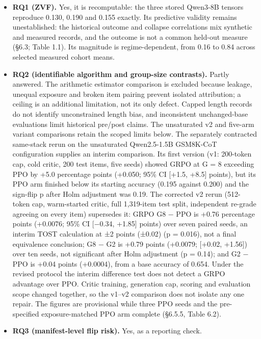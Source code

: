 \documentclass[12pt,a4paper]{report}
\providecommand{\tightlist}{%
  \setlength{\itemsep}{0pt}\setlength{\parskip}{0pt}}
\begin{document}
\begin{itemize}
\tightlist
\item
  \textbf{RQ1 (ZVF).} Yes, it is recomputable: the three stored Qwen3-8B
  tensors reproduce 0.130, 0.190 and 0.155 exactly. Its predictive
  validity remains unestablished: the historical outcome and collapse
  correlations mix synthetic and measured records, and the outcome is
  not a common held-out measure (§6.3; Table 1.1). Its magnitude is
  regime-dependent, from 0.16 to 0.84 across selected measured cohort
  means.
\item
  \textbf{RQ2 (identifiable algorithm and group-size contrasts).} Partly
  answered. The arithmetic estimator comparison is excluded because
  leakage, unequal exposure and broken item pairing prevent isolated
  attribution; a ceiling is an additional limitation, not its only
  defect. Capped length records do not identify unconstrained length
  bias, and inconsistent unchanged-base evaluations limit historical
  pre/post claims. The unsaturated v2 and five-arm variant comparisons
  retain the scoped limits below. The separately contracted same-stack
  rerun on the unsaturated Qwen2.5-1.5B GSM8K-CoT configuration supplies
  an interim comparison. Its first version (v1: 200-token cap, cold
  critic, 200 test items, five seeds) showed GRPO at G = 8 exceeding PPO
  by +5.0 percentage points (+0.050; 95\% CI {[}+1.5, +8.5{]} points),
  but its PPO arm finished below its starting accuracy (0.195 against
  0.200) and the sign-flip p after Holm adjustment was 0.19. The
  corrected v2 rerun (512-token cap, warm-started critic, full
  1,319-item test split, independent re-grade agreeing on every item)
  supersedes it: GRPO G8 − PPO is +0.76 percentage points (+0.0076; 95\%
  CI {[}−0.34, +1.85{]} points) over seven paired seeds, an interim TOST
  calculation at ±2 points (±0.02) (p = 0.016), not a final equivalence
  conclusion; G8 − G2 is +0.79 points (+0.0079; {[}+0.02, +1.56{]}) over
  ten seeds, not significant after Holm adjustment (p = 0.14); and G2 −
  PPO is +0.04 points (+0.0004), from a base accuracy of 0.654. Under
  the revised protocol the interim difference test does not detect a
  GRPO advantage over PPO. Critic training, generation cap, scoring and
  evaluation scope changed together, so the v1--v2 comparison does not
  isolate any one repair. The figures are provisional while three PPO
  seeds and the pre-specified exposure-matched PPO arm complete (§6.5.5,
  Table 6.2).
\item
  \textbf{RQ3 (manifest-level flip risk).} Yes, as a reporting check.

\end{itemize}
\end{document}
